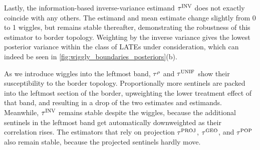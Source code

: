 	Lastly, the information-based inverse-variance estimand \(\tau^{\mathrm{INV}}\) does not exactly coincide with any others.
The estimand and mean estimate change slightly from 0 to 1 wiggles, but remains stable thereafter, demonstrating the robustness of this estimator to border topology.
Weighting by the inverse variance gives the lowest posterior variance within the class of LATEs under consideration, which can indeed be seen in \autoref{fig:wiggly_boundaries_posteriors}(b).

	As we introduce wiggles into the leftmost band,
\(\tau^{\rho}\) and \(\tau^{\mathrm{UNIF}}\) show their susceptibility to the border topology.
Proportionally more sentinels are packed into the leftmost section of the border,
upweighting the lower treatment effect of that band,
and resulting in a drop of the two estimates and estimands.
Meanwhile, \(\tau^{\mathrm{INV}}\) remains stable despite the wiggles,
because the additional sentinels in the leftmost
band get automatically downweighted as their correlation rises.
The estimators that rely on projection
\(\tau^{\mathrm{PROJ}}\), \(\tau^{\mathrm{GEO}}\), and \(\tau^{\mathrm{POP}}\) also remain stable,
because the projected sentinels hardly move.
    
